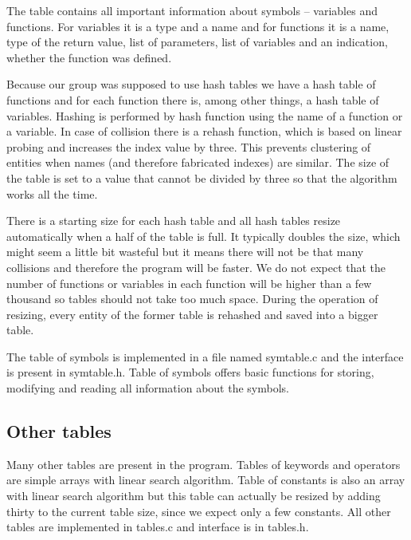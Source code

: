 \documentclass[10pt,a4paper,titlepage]{article}
\begin{document}
\begin{justify}

The table contains all important information about symbols – variables and
functions. For variables it is a type and a name and for functions it is a name,
type of the return value, list of parameters, list of variables and an
indication, whether the function was defined.

Because our group was supposed to use hash tables we have a hash table of
functions and for each function there is, among other things, a hash table of
variables. Hashing is performed by hash function using the name of a function
or a variable. In case of collision there is a rehash function, which is based
on linear probing and increases the index value by three. This prevents
clustering of entities when names (and therefore fabricated indexes) are
similar. The size of the table is set to a value that cannot be divided by
three so that the algorithm works all the time.

There is a starting size for each hash table and all hash tables resize
automatically when a half of the table is full. It typically doubles the size,
which might seem a little bit wasteful but it means there will not be that many
collisions and therefore the program will be faster. We do not expect that the
number of functions or variables in each function will be higher than a few
thousand so tables should not take too much space. During the operation of
resizing, every entity of the former table is rehashed and saved into a bigger
table.

The table of symbols is implemented in a file named symtable.c and the
interface is present in symtable.h. Table of symbols offers basic functions
for storing, modifying and reading all information about the symbols.

\end{justify}

\subsection{Other tables}

\begin{justify}

Many other tables are present in the program. Tables of keywords and operators
are simple arrays with linear search algorithm. Table of constants is also an
array with linear search algorithm but this table can actually be resized by
adding thirty to the current table size, since we expect only a few constants.
All other tables are implemented in tables.c and interface is in tables.h.

\end{justify}
\end{document}

